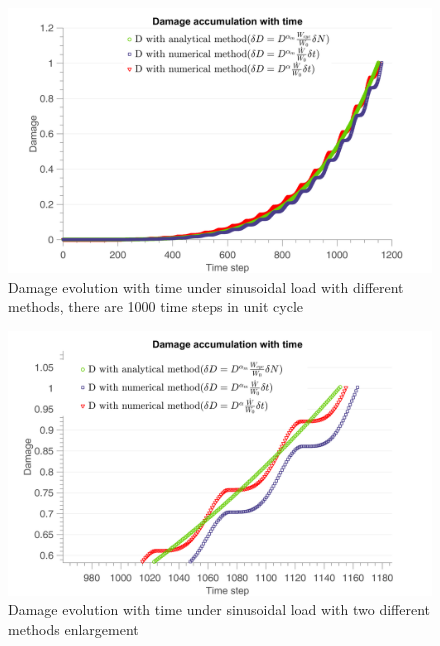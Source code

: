 \documentclass[3p,times,number,review]{elsarticle}
\begin{document}
\begin{figure}[!h]
\centering
\includegraphics[width=\textwidth]{figures//D_3methods2_100steps.png} 
\caption{Damage evolution with time under sinusoidal load with different methods, there are 1000 time steps in unit cycle}
\label{damsin1000}
\end{figure}

\begin{figure}[!h]
\centering
\includegraphics[width=\textwidth]{figures//D_3methods_100steps_enlarge.png} 
\caption{Damage evolution with time under sinusoidal load with two different methods enlargement}
\label{damsinenglarge}
\end{figure}
\end{document}
